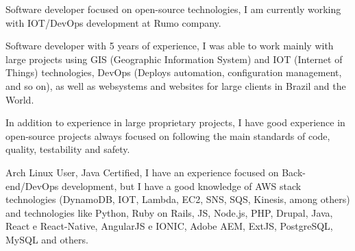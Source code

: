 

\begin{cvparagraph}

Software developer focused on open-source technologies, I am currently working with IOT/DevOps development at Rumo company.

Software developer with 5 years of experience, I was able to work mainly with large projects using GIS (Geographic Information System) and IOT (Internet of Things) technologies, DevOps (Deploys automation, configuration management, and so on), as well as websystems and websites for large clients in Brazil and the World.

In addition to experience in large proprietary projects, I have good experience in open-source projects always focused on following the main standards of code, quality, testability and safety.

Arch Linux User, Java Certified, I have an experience focused on Back-end/DevOps development, but I have a good knowledge of AWS stack technologies (DynamoDB, IOT, Lambda, EC2, SNS, SQS, Kinesis, among others) and technologies like Python, Ruby on Rails, JS, Node.js, PHP, Drupal, Java, React e React-Native, AngularJS e IONIC, Adobe AEM, ExtJS, PostgreSQL, MySQL and others.
\end{cvparagraph}
